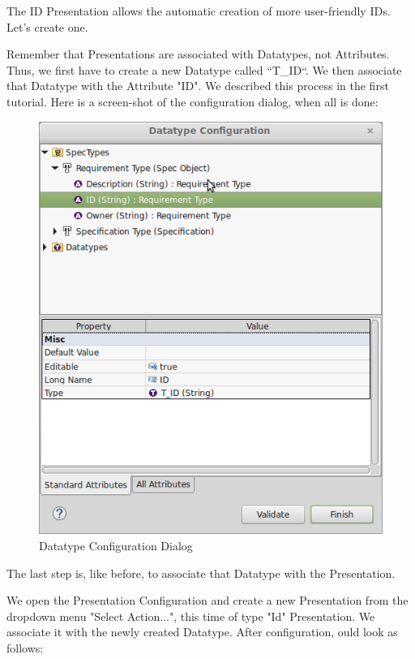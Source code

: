 The ID Presentation allows the automatic creation of more user-friendly IDs.  Let's create
one.

Remember that Presentations are associated with Datatypes, not
Attributes.  Thus, we first have to create a new Datatype called ``T\_ID``.  We then
associate that Datatype with the Attribute "ID".  We described this
process in the first tutorial.  Here is a screen-shot of the
configuration dialog, when all is done:

\begin{figure}[h!]
\centering      
\includegraphics[width=0.8\linewidth]{../rmf-images/t_id.png}      
\caption{Datatype Configuration Dialog}      
\label{fig:datatypeConfig}
\end{figure}

The last step is, like before, to associate that Datatype with the
Presentation.

We open the Presentation Configuration and create a new Presentation
from the dropdown menu "Select Action...", this time of type "Id"
Presentation.  We associate it with the newly created Datatype.  After
configuration, ould look as follows:

